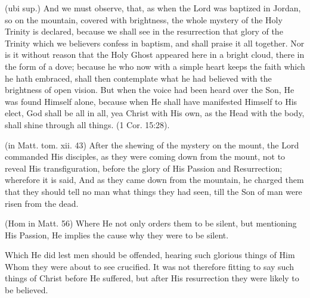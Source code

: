  (ubi sup.) And we must observe, that, as when the Lord was baptized in Jordan, so on the mountain, covered with brightness, the whole mystery of the Holy Trinity is declared, because we shall see in the resurrection that glory of the Trinity which we believers confess in baptism, and shall praise it all together. Nor is it without reason that the Holy Ghost appeared here in a bright cloud, there in the form of a dove; because he who now with a simple heart keeps the faith which he hath embraced, shall then contemplate what he had believed with the brightness of open vision. But when the voice had been heard over the Son, He was found Himself alone, because when He shall have manifested Himself to His elect, God shall be all in all, yea Christ with His own, as the Head with the body, shall shine through all things. (1 Cor. 15:28).

 

 (in Matt. tom. xii. 43) After the shewing of the mystery on the mount, the Lord commanded His disciples, as they were coming down from the mount, not to reveal His transfiguration, before the glory of His Passion and Resurrection; wherefore it is said, And as they came down from the mountain, he charged them that they should tell no man what things they had seen, till the Son of man were risen from the dead.

 (Hom in Matt. 56) Where He not only orders them to be silent, but mentioning His Passion, He implies the cause why they were to be silent.

 Which He did lest men should be offended, hearing such glorious things of Him Whom they were about to see crucified. It was not therefore fitting to say such things of Christ before He suffered, but after His resurrection they were likely to be believed.

